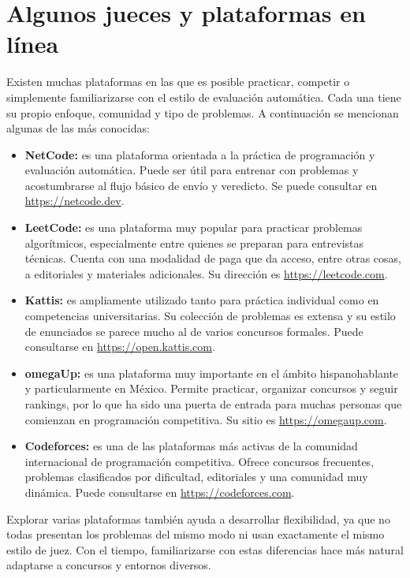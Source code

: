 \section{Algunos jueces y plataformas en línea}

Existen muchas plataformas en las que es posible practicar, competir o simplemente familiarizarse con el estilo de evaluación automática. Cada una tiene su propio enfoque, comunidad y tipo de problemas. A continuación se mencionan algunas de las más conocidas:

\begin{itemize}
    \item \textbf{NetCode:} es una plataforma orientada a la práctica de programación y evaluación automática. Puede ser útil para entrenar con problemas y acostumbrarse al flujo básico de envío y veredicto. Se puede consultar en \url{https://netcode.dev}.
    \item \textbf{LeetCode:} es una plataforma muy popular para practicar problemas algorítmicos, especialmente entre quienes se preparan para entrevistas técnicas. Cuenta con una modalidad de paga que da acceso, entre otras cosas, a editoriales y materiales adicionales. Su dirección es \url{https://leetcode.com}.
    \item \textbf{Kattis:} es ampliamente utilizado tanto para práctica individual como en competencias universitarias. Su colección de problemas es extensa y su estilo de enunciados se parece mucho al de varios concursos formales. Puede consultarse en \url{https://open.kattis.com}.
    \item \textbf{omegaUp:} es una plataforma muy importante en el ámbito hispanohablante y particularmente en México. Permite practicar, organizar concursos y seguir rankings, por lo que ha sido una puerta de entrada para muchas personas que comienzan en programación competitiva. Su sitio es \url{https://omegaup.com}.
    \item \textbf{Codeforces:} es una de las plataformas más activas de la comunidad internacional de programación competitiva. Ofrece concursos frecuentes, problemas clasificados por dificultad, editoriales y una comunidad muy dinámica. Puede consultarse en \url{https://codeforces.com}.
\end{itemize}

Explorar varias plataformas también ayuda a desarrollar flexibilidad, ya que no todas presentan los problemas del mismo modo ni usan exactamente el mismo estilo de juez. Con el tiempo, familiarizarse con estas diferencias hace más natural adaptarse a concursos y entornos diversos.

